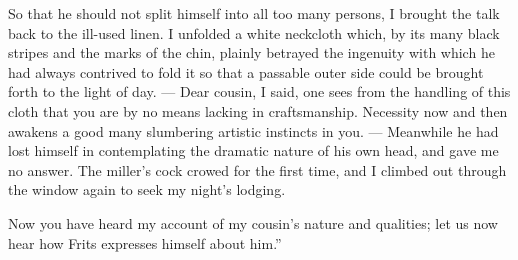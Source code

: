 \documentclass[12pt]{article}
\begin{document}
So that he should not split himself into all too many persons, I brought the talk back to the ill-used linen. I unfolded a white neckcloth which, by its many black stripes and the marks of the chin, plainly betrayed the ingenuity with which he had always contrived to fold it so that a passable outer side could be brought forth to the light of day. --- Dear cousin, I said, one sees from the handling of this cloth that you are by no means lacking in craftsmanship. Necessity now and then awakens a good many slumbering artistic instincts in you. --- Meanwhile he had lost himself in contemplating the dramatic nature of his own head, and gave me no answer. The miller's cock crowed for the first time, and I climbed out through the window again to seek my night's lodging.

Now you have heard my account of my cousin's nature and qualities; let us now hear how Frits expresses himself about him.''
\end{document}
